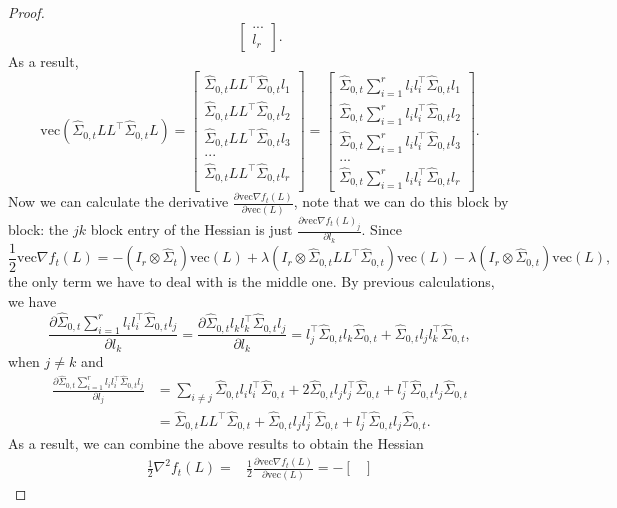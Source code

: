 \documentclass[11pt]{article}
\newcommand{\sot}{\widehat{\Sigma}_{0,t}}
\newcommand{\0}{{\mathbf{0}}}
\newcommand{\ve}{{\mathrm{vec}}}
\begin{document}
\begin{proof}
\begin{equation*}
\begin{bmatrix}
...\\
l_r
\end{bmatrix}.
\end{equation*}
As a result, \begin{equation*}
\ve(\sot LL^\top  \sot L)=\begin{bmatrix}
\sot LL^\top  \sot l_1 \\
\sot LL^\top  \sot l_2\\
\sot LL^\top  \sot l_3\\
...\\
\sot LL^\top  \sot l_r\\
\end{bmatrix}=\begin{bmatrix}
\sot \sum_{i=1}^r l_il_i^\top  \sot l_1 \\
\sot \sum_{i=1}^r l_il_i^\top  \sot l_2\\
\sot \sum_{i=1}^r l_il_i^\top  \sot l_3\\
...\\
\sot\sum_{i=1}^r l_il_i^\top  \sot l_r
\end{bmatrix}.
\end{equation*}
Now we can calculate the derivative $\frac{\partial\ve \nabla f_t(L)}{\partial\ve(L)}$, note that we can do this block by block: the $jk$ block entry of the Hessian is just $\frac{\partial\ve \nabla f_t(L)_j}{\partial l_k}$. Since\begin{equation*}
\frac{1}{2}\ve \nabla f_t(L)=-(I_{r}\otimes \widehat{\Sigma}_t)\ve (L)+\lambda(I_r\otimes\sot LL^\top  \sot)\ve (L)-\lambda (I_{r}\otimes \sot)\ve(L),
\end{equation*}
the only term we have to deal with is the middle one. By previous calculations, we have 
\begin{equation*}
\frac{\partial \sot \sum_{i=1}^r l_il_i^\top  \sot l_j}{\partial l_k}=\frac{\partial \sot l_kl_k^\top  \sot l_j}{\partial l_k}=l_j^\top  \sot l_k\sot+\sot l_j l_k^\top\sot,
\end{equation*}
when $j\neq k$ and \begin{align*}
\frac{\partial \sot \sum_{i=1}^r l_il_i^\top  \sot l_j}{\partial l_j}&=\sum_{i\neq j}\sot l_il_i^\top  \sot + 2\sot l_jl_j^\top  \sot+l_j^\top  \sot l_j\sot\\&=\sot LL^\top  \sot+\sot l_jl_j^\top  \sot+l_j^\top  \sot l_j\sot.
\end{align*}
As a result, we can combine the above results to obtain the Hessian \begin{align*}
\frac{1}{2}\nabla^2f_t(L)=&\frac{1}{2}\frac{\partial\ve \nabla f_t(L)}{\partial\ve(L)}=-\begin{bmatrix}

\end{bmatrix}
\end{align*}
\end{proof}
\end{document}
